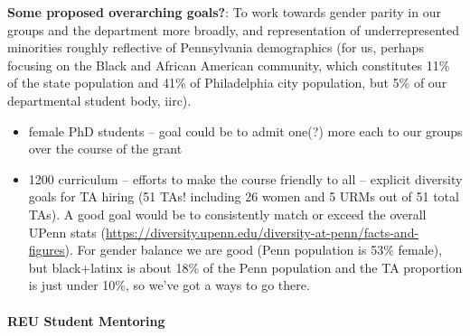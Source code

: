 \textbf{Some proposed overarching goals?}: To work towards gender parity in our
groups and the department more broadly, and representation of underrepresented
minorities roughly reflective of Pennsylvania demographics (for us, perhaps
focusing on the Black and African American community, which constitutes 11\% of
the state population and 41\% of Philadelphia city population, but 5\% of our
departmental student body, iirc).

\begin{itemize}
\item female PhD students -- goal could be to admit one(?) more each to
our groups over the course of the grant
\item 1200 curriculum -- efforts to make the course friendly to all --
explicit diversity goals for TA hiring (51 TAs! including 26 women and
5 URMs out of 51 total TAs).  A good goal would be to consistently
match or exceed the overall UPenn stats
(\url{https://diversity.upenn.edu/diversity-at-penn/facts-and-figures}).
For gender balance we are good (Penn population is 53\% female), but
black+latinx is about 18\% of the Penn population and the TA
proportion is just under 10\%, so we've got a ways
to go there.
\end{itemize}

\setcounter{footnote}{0}

\paragraph*{REU Student Mentoring}

